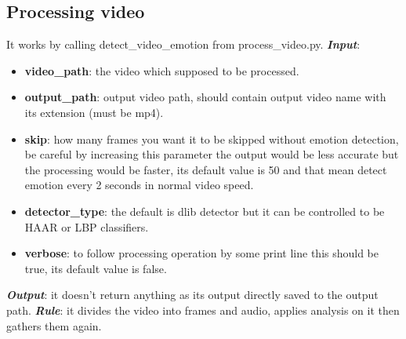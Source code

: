 \subsection{Processing video}
It works by calling detect\_video\_emotion from process\_video.py.
\newline \textbf{\textit{Input}}: 
\begin{itemize}
\item  \textbf{video\_path}: the video which supposed to be processed.
\item  \textbf{output\_path}: output video path, should contain output video name with its extension (must be mp4).
\item  \textbf{skip}: how many frames you want it to be skipped without emotion detection, be careful by increasing this parameter the output would be less accurate but the processing would be faster, its default value is 50 and that mean detect emotion every 2 seconds in normal video speed.
\item \textbf{detector\_type}: the default is dlib detector but it can be controlled to be HAAR or LBP classifiers.
\item  \textbf{verbose}: to follow processing operation by some print line this should be true, its default value is false.
\end{itemize}
\textbf{\textit{Output}}: it doesn't return anything as its output directly saved to the output path.
\newline\textbf{\textit{ Rule}}: it divides the video into frames and audio, applies analysis on it then gathers them again.
\newline 